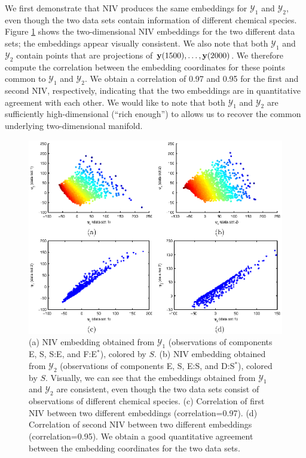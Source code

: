 We first demonstrate that NIV produces the same embeddings for $\mathcal{Y}_1$ and $\mathcal{Y}_2$, even though the two data sets contain information of different chemical species.
%
Figure \ref{fig:rxn_embedding} shows the two-dimensional NIV embeddings for the two different data sets; the embeddings appear visually consistent.
%
We also note that both $\mathcal{Y}_1$ and $\mathcal{Y}_2$ contain points that are projections of $\mathbf{y}(1500), \dots, \mathbf{y}(2000)$.
%
We therefore compute the correlation between the embedding coordinates for these points common to $\mathcal{Y}_1$ and $\mathcal{Y}_2$.
%
We obtain a correlation of 0.97 and 0.95 for the first and second NIV, respectively, indicating that the two embeddings are in quantitative
agreement with each other.
%
We would like to note that both $\mathcal{Y}_1$ and $\mathcal{Y}_2$ are sufficiently high-dimensional (``rich enough'') to allows us to recover
the common underlying two-dimensional manifold.
%
\begin{figure}[t]
    \includegraphics[width=6in]{fig4}
    \caption[Intrinsic variable embeddings for chemical reaction network data]{(a) NIV embedding obtained from $\mathcal{Y}_1$ (observations of components E, S, S:E, and F:E$^{*}$), colored by $S$. (b) NIV embedding obtained from $\mathcal{Y}_2$ (observations of components E, S, E:S, and D:S$^{*}$), colored by $S$. Visually, we can see that the embeddings obtained from $\mathcal{Y}_1$ and $\mathcal{Y}_2$ are consistent, even though the two data sets consist of observations of different chemical species. (c) Correlation of first NIV between two different embeddings (correlation=0.97). (d)  Correlation of second NIV between two different embeddings (correlation=0.95). We obtain a good quantitative agreement between the embedding coordinates for the two data sets.}
    \label{fig:rxn_embedding}
\end{figure}

